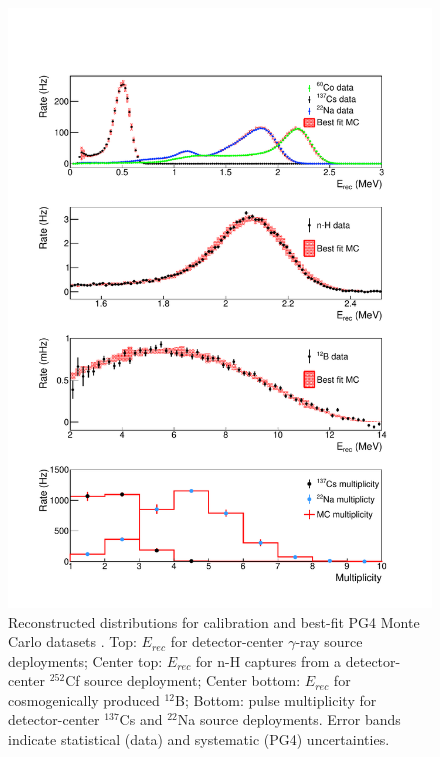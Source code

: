 \begin{figure}[h]
	\centering
	\includegraphics[width=0.7\linewidth]{tex/5-analysis-images/GammaE}
	\caption[]{Reconstructed distributions for calibration and best-fit PG4 Monte Carlo datasets \cite{XZhang:2815}. Top: $E_{rec}$ for detector-center $\gamma$-ray source deployments; Center top: $E_{rec}$ for n-H captures from a detector-center $^{252}$Cf source deployment; Center bottom: $E_{rec}$ for cosmogenically produced $^{12}$B; Bottom: pulse multiplicity for detector-center $^{137}$Cs and $^{22}$Na source deployments. Error bands indicate statistical (data) and systematic (PG4) uncertainties.}
	\label{fig:gammae}
\end{figure}

